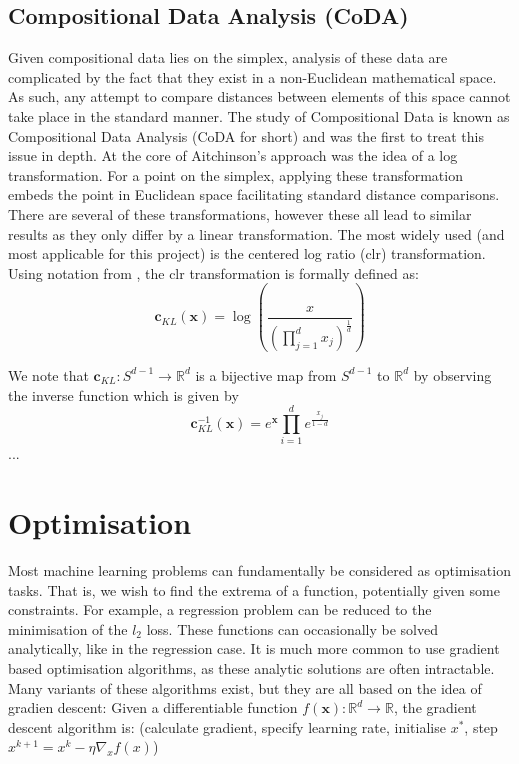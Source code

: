  
\subsection{Compositional Data Analysis (CoDA)}
\label{coda}
Given compositional data lies on the simplex, analysis of these data are complicated by the fact that they exist in a non-Euclidean mathematical space. As such, any attempt to compare distances between elements of this space cannot take place in the standard manner. The study of Compositional Data is known as Compositional Data Analysis (CoDA for short) and \cite{Aitchison1982} was the first to treat this issue in depth. At the core of Aitchinson's approach was the idea of a log transformation. For a point on the simplex, applying these transformation embeds the point in Euclidean space facilitating standard distance comparisons. There are several of these transformations, however these all lead to similar results as they only differ by a linear transformation. The most widely used (and most applicable for this project) is the centered log ratio (clr) transformation. Using notation from \cite{Avalos2018}, the clr transformation is formally defined as: $$\mathbf{c}_{KL}(\mathbf{x}) = \log \left(\frac{x}{(\prod_{j=1}^d x_j)^{\frac{1}{d}}}\right)$$  

We note that $\mathbf{c}_{KL} : S^{d-1} \to  \mathbb{R}^d$ is a bijective map from $S^{d-1}$ to  $\mathbb{R}^d$ by observing the inverse function which is given by 
$$\mathbf{c}_{KL}^{-1}(\mathbf{x}) = e^\mathbf{x} \prod_{i=1}^d e^{\frac{x_j}{1-d}}$$ ...


\section{Optimisation}
\label{optimisation}
Most machine learning problems can fundamentally be considered as optimisation tasks. That is, we wish to find the extrema of a function, potentially given some constraints. For example, a regression problem can be reduced to the minimisation of the $l_2$ loss. These functions can occasionally be solved analytically, like in the regression case. It is much more common to use gradient based optimisation algorithms, as these analytic solutions are often intractable. Many variants of these algorithms exist, but they are all based on the idea of gradien descent: Given a differentiable function $f(\mathbf{x}) : \mathbb{R}^d \to \mathbb{R}$, the gradient descent algorithm is: (calculate gradient, specify learning rate, initialise $x^*$, step $x^{k+1} = x ^ k - \eta \nabla_x f(x)$) \\



